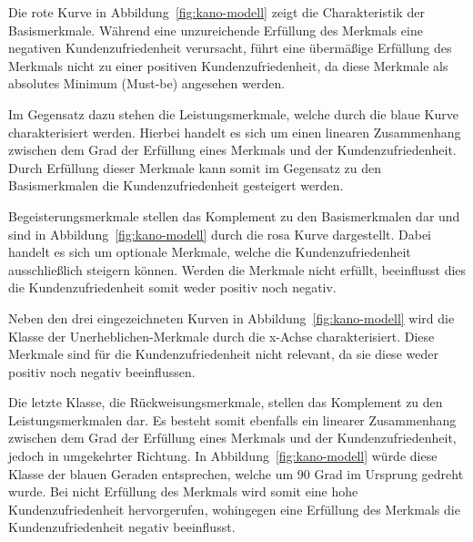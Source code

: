 Die rote Kurve in Abbildung~\ref{fig:kano-modell} zeigt die Charakteristik der Basismerkmale.
Während eine unzureichende Erfüllung des Merkmals eine negativen Kundenzufriedenheit verursacht, führt eine übermäßige Erfüllung des Merkmals nicht zu einer positiven Kundenzufriedenheit, da diese Merkmale als absolutes Minimum (Must-be) angesehen werden.

Im Gegensatz dazu stehen die Leistungsmerkmale, welche durch die blaue Kurve charakterisiert werden.
Hierbei handelt es sich um einen linearen Zusammenhang zwischen dem Grad der Erfüllung eines Merkmals und der Kundenzufriedenheit.
Durch Erfüllung dieser Merkmale kann somit im Gegensatz zu den Basismerkmalen die Kundenzufriedenheit gesteigert werden.

Begeisterungsmerkmale stellen das Komplement zu den Basismerkmalen dar und sind in Abbildung~\ref{fig:kano-modell} durch die rosa Kurve dargestellt.
Dabei handelt es sich um optionale Merkmale, welche die Kundenzufriedenheit ausschließlich steigern können.
Werden die Merkmale nicht erfüllt, beeinflusst dies die Kundenzufriedenheit somit weder positiv noch negativ.

Neben den drei eingezeichneten Kurven in Abbildung~\ref{fig:kano-modell} wird die Klasse der Unerheblichen-Merkmale durch die x-Achse charakterisiert.
Diese Merkmale sind für die Kundenzufriedenheit nicht relevant, da sie diese weder positiv noch negativ beeinflussen.

Die letzte Klasse, die Rückweisungsmerkmale, stellen das Komplement zu den Leistungsmerkmalen dar.
Es besteht somit ebenfalls ein linearer Zusammenhang zwischen dem Grad der Erfüllung eines Merkmals und der Kundenzufriedenheit, jedoch in umgekehrter Richtung.
In Abbildung~\ref{fig:kano-modell} würde diese Klasse der blauen Geraden entsprechen, welche um 90 Grad im Ursprung gedreht wurde.
Bei nicht Erfüllung des Merkmals wird somit eine hohe Kundenzufriedenheit hervorgerufen, wohingegen eine Erfüllung des Merkmals die Kundenzufriedenheit negativ beeinflusst.
\newline


